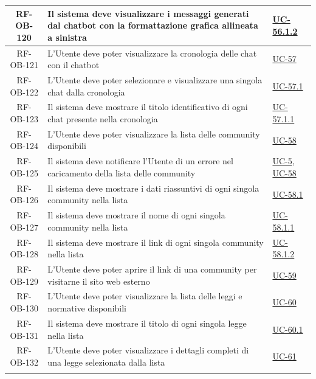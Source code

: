 \documentclass[a4paper,12pt]{article}
\begin{document}
\begin{center}
\begin{longtable}{|c|p{8.5cm}|>{\centering\arraybackslash}p{4cm}|}
\hline
\rowcolor{gray!20}
RF-OB-120 & Il sistema deve visualizzare i messaggi generati dal chatbot con la formattazione grafica allineata a sinistra & \hyperref[subsec:UC-56.1.2]{UC-56.1.2} \\
\hline
\rowcolor{white}
RF-OB-121 & L'Utente deve poter visualizzare la cronologia delle chat con il chatbot & \hyperref[subsec:UC-57]{UC-57} \\
\hline
\rowcolor{gray!20}
RF-OB-122 & L'Utente deve poter selezionare e visualizzare una singola chat dalla cronologia & \hyperref[subsec:UC-57.1]{UC-57.1} \\
\hline
\rowcolor{white}
RF-OB-123 & Il sistema deve mostrare il titolo identificativo di ogni chat presente nella cronologia & \hyperref[subsec:UC-57.1.1]{UC-57.1.1} \\
\hline
\rowcolor{gray!20}
RF-OB-124 & L'Utente deve poter visualizzare la lista delle community disponibili & \hyperref[sec:UC-58]{UC-58} \\
\hline
\rowcolor{white}
RF-OB-125 & Il sistema deve notificare l'Utente di un errore nel caricamento della lista delle community & \hyperref[sec:UC-5]{UC-5}, \hyperref[sec:UC-58]{UC-58} \\
\hline
\rowcolor{gray!20}
RF-OB-126 & Il sistema deve mostrare i dati riassuntivi di ogni singola community nella lista & \hyperref[subsec:UC-58.1]{UC-58.1} \\
\hline
\rowcolor{white}
RF-OB-127 & Il sistema deve mostrare il nome di ogni singola community nella lista & \hyperref[subsec:UC-58.1.1]{UC-58.1.1} \\
\hline
\rowcolor{gray!20}
RF-OB-128 & Il sistema deve mostrare il link di ogni singola community nella lista & \hyperref[subsec:UC-58.1.2]{UC-58.1.2} \\
\hline
\rowcolor{white}
RF-OB-129 & L'Utente deve poter aprire il link di una community per visitarne il sito web esterno & \hyperref[sec:UC-59]{UC-59} \\
\hline
\rowcolor{gray!20}
RF-OB-130 & L'Utente deve poter visualizzare la lista delle leggi e normative disponibili & \hyperref[sec:UC-60]{UC-60} \\
\hline
\rowcolor{white}
RF-OB-131 & Il sistema deve mostrare il titolo di ogni singola legge nella lista & \hyperref[subsec:UC-60.1]{UC-60.1} \\
\hline
\rowcolor{gray!20}
RF-OB-132 & L'Utente deve poter visualizzare i dettagli completi di una legge selezionata dalla lista & \hyperref[sec:UC-61]{UC-61} \\
\hline
\rowcolor{white}

\end{longtable}
\end{center}
\end{document}
